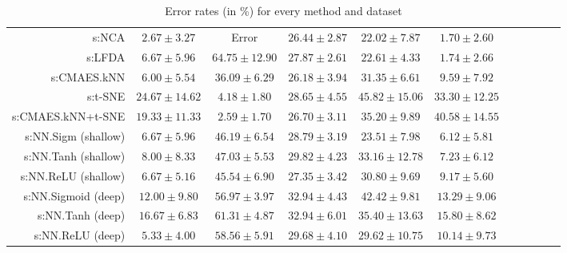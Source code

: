 \begin{table}[ht]
{\begin{tabular}{rcccccccccc}
s:NCA & $\bm{2.67\pm3.27}$ & Error  & $26.44\pm2.87$ & $\bm{22.02\pm7.87}$ & $\bm{1.70\pm2.60}$ \\
s:LFDA & $6.67\pm5.96$ & $64.75\pm12.90$ & $27.87\pm2.61$ & $22.61\pm4.33$ & $1.74\pm2.66$ \\
s:CMAES.kNN & $6.00\pm5.54$ & $36.09\pm6.29$ & $\bm{26.18\pm3.94}$ & $31.35\pm6.61$ & $9.59\pm7.92$ \\
s:t-SNE & $24.67\pm14.62$ & $4.18\pm1.80$ & $28.65\pm4.55$ & $45.82\pm15.06$ & $33.30\pm12.25$ \\
s:CMAES.kNN+t-SNE & $19.33\pm11.33$ & $\bm{2.59\pm1.70}$ & $26.70\pm3.11$ & $35.20\pm9.89$ & $40.58\pm14.55$ \\
s:NN.Sigm (shallow) & $6.67\pm5.96$ & $46.19\pm6.54$ & $28.79\pm3.19$ & $23.51\pm7.98$ & $6.12\pm5.81$ \\
s:NN.Tanh (shallow) & $8.00\pm8.33$ & $47.03\pm5.53$ & $29.82\pm4.23$ & $33.16\pm12.78$ & $7.23\pm6.12$ \\
s:NN.ReLU (shallow) & $6.67\pm5.16$ & $45.54\pm6.90$ & $27.35\pm3.42$ & $30.80\pm9.69$ & $9.17\pm5.60$ \\
s:NN.Sigmoid (deep) & $12.00\pm9.80$ & $56.97\pm3.97$ & $32.94\pm4.43$ & $42.42\pm9.81$ & $13.29\pm9.06$ \\
s:NN.Tanh (deep) & $16.67\pm6.83$ & $61.31\pm4.87$ & $32.94\pm6.01$ & $35.40\pm13.63$ & $15.80\pm8.62$ \\
s:NN.ReLU (deep) & $5.33\pm4.00$ & $58.56\pm5.91$ & $29.68\pm4.10$ & $29.62\pm10.75$ & $10.14\pm9.73$ \\


\bottomrule
\end{tabular}
}
\caption{Error rates (in \%) for every method and dataset} \label{tab:dim-error-rates}
\end{table}
